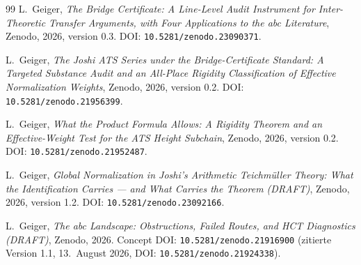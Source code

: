 \documentclass[11pt,a4paper]{article}
\begin{document}
\begin{thebibliography}{99}
L.~Geiger,
\emph{The Bridge Certificate: A Line-Level Audit Instrument for
Inter-Theoretic Transfer Arguments, with Four Applications to the abc Literature},
Zenodo, 2026, version 0.3.
DOI: \nolinkurl{10.5281/zenodo.23090371}.

L.~Geiger,
\emph{The Joshi ATS Series under the Bridge-Certificate Standard:
A Targeted Substance Audit and an All-Place Rigidity Classification
of Effective Normalization Weights},
Zenodo, 2026, version 0.2.
DOI: \nolinkurl{10.5281/zenodo.21956399}.

L.~Geiger,
\emph{What the Product Formula Allows: A Rigidity Theorem and an
Effective-Weight Test for the ATS Height Subchain},
Zenodo, 2026, version 0.2.
DOI: \nolinkurl{10.5281/zenodo.21952487}.

L.~Geiger,
\emph{Global Normalization in Joshi's Arithmetic Teichmüller Theory:
What the Identification Carries --- and What Carries the Theorem (DRAFT)},
Zenodo, 2026, version 1.2.
DOI: \nolinkurl{10.5281/zenodo.23092166}.

L.~Geiger,
\emph{The abc Landscape: Obstructions, Failed Routes, and HCT Diagnostics
(DRAFT)},
Zenodo, 2026.
Concept DOI: \nolinkurl{10.5281/zenodo.21916900}
(zitierte Version 1.1, 13.~August 2026, DOI: \nolinkurl{10.5281/zenodo.21924338}).

\end{thebibliography}
\end{document}
